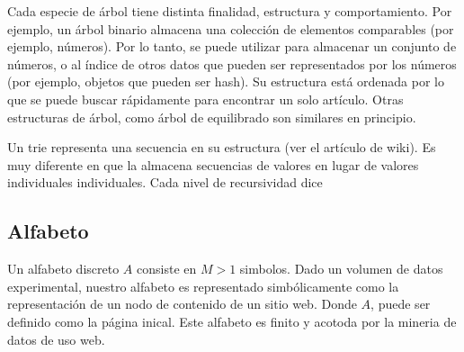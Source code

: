 Cada especie de árbol tiene distinta finalidad, estructura y comportamiento. Por ejemplo, un árbol binario almacena una colección de elementos comparables (por ejemplo, números). Por lo tanto, se puede utilizar para almacenar un conjunto de números, o al índice de otros datos que pueden ser representados por los números (por ejemplo, objetos que pueden ser hash). Su estructura está ordenada por lo que se puede buscar rápidamente para encontrar un solo artículo. Otras estructuras de árbol, como árbol de equilibrado son similares en principio.

Un trie representa una secuencia en su estructura (ver el artículo de wiki). Es muy diferente en que la almacena secuencias de valores en lugar de valores individuales individuales. Cada nivel de recursividad dice 




\subsection{Alfabeto}

Un alfabeto discreto $A$ consiste en $M > 1$ simbolos.
Dado un volumen de datos experimental, nuestro alfabeto es representado simbólicamente como la representación de un nodo de contenido de un sitio web.
Donde $A$, puede ser definido como la página inical. Este alfabeto es finito y acotoda por la mineria de datos de uso web.




